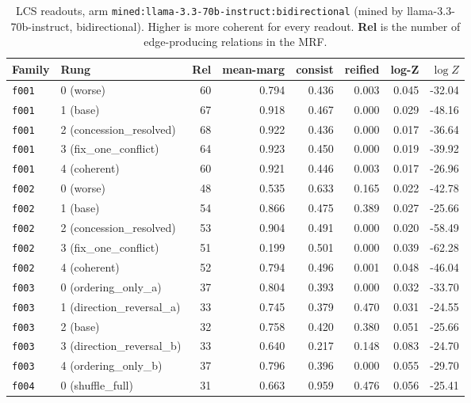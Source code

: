 \documentclass[11pt]{article}
\begin{document}
\begin{table}[htbp]
\centering
\small
\caption{LCS readouts, arm \texttt{mined:llama-3.3-70b-instruct:bidirectional} (mined by llama-3.3-70b-instruct, bidirectional). Higher is more coherent for every readout. \textbf{Rel} is the number of edge-producing relations in the MRF.}
\label{tab:scores-mined-llama-3-3-70b-instruct-bidirectional}
\begin{tabular}{llrrrrrr}
\toprule
Family & Rung & Rel & \textbf{mean-marg} & \textbf{consist} & \textbf{reified} & \textbf{log-Z} & $\log Z$ \\
\midrule
\texttt{f001} & 0 (worse) & 60 & 0.794 & 0.436 & 0.003 & 0.045 & -32.04 \\
\texttt{f001} & 1 (base) & 67 & 0.918 & 0.467 & 0.000 & 0.029 & -48.16 \\
\texttt{f001} & 2 (concession\_resolved) & 68 & 0.922 & 0.436 & 0.000 & 0.017 & -36.64 \\
\texttt{f001} & 3 (fix\_one\_conflict) & 64 & 0.923 & 0.450 & 0.000 & 0.019 & -39.92 \\
\texttt{f001} & 4 (coherent) & 60 & 0.921 & 0.446 & 0.003 & 0.017 & -26.96 \\
\midrule
\texttt{f002} & 0 (worse) & 48 & 0.535 & 0.633 & 0.165 & 0.022 & -42.78 \\
\texttt{f002} & 1 (base) & 54 & 0.866 & 0.475 & 0.389 & 0.027 & -25.66 \\
\texttt{f002} & 2 (concession\_resolved) & 53 & 0.904 & 0.491 & 0.000 & 0.020 & -58.49 \\
\texttt{f002} & 3 (fix\_one\_conflict) & 51 & 0.199 & 0.501 & 0.000 & 0.039 & -62.28 \\
\texttt{f002} & 4 (coherent) & 52 & 0.794 & 0.496 & 0.001 & 0.048 & -46.04 \\
\midrule
\texttt{f003} & 0 (ordering\_only\_a) & 37 & 0.804 & 0.393 & 0.000 & 0.032 & -33.70 \\
\texttt{f003} & 1 (direction\_reversal\_a) & 33 & 0.745 & 0.379 & 0.470 & 0.031 & -24.55 \\
\texttt{f003} & 2 (base) & 32 & 0.758 & 0.420 & 0.380 & 0.051 & -25.66 \\
\texttt{f003} & 3 (direction\_reversal\_b) & 33 & 0.640 & 0.217 & 0.148 & 0.083 & -24.70 \\
\texttt{f003} & 4 (ordering\_only\_b) & 37 & 0.796 & 0.396 & 0.000 & 0.055 & -29.70 \\
\midrule
\texttt{f004} & 0 (shuffle\_full) & 31 & 0.663 & 0.959 & 0.476 & 0.056 & -25.41 \\

\end{tabular}
\end{table}
\end{document}
